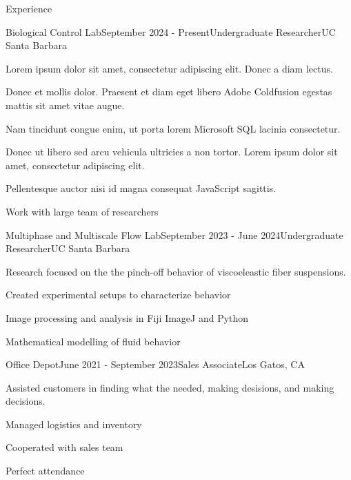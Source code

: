 \documentclass[
	11pt, %
]{resume} %
\begin{document}
\begin{rSection}{Experience}

	\begin{rSubsection}{Biological Control Lab}{September 2024 - Present}{Undergraduate Researcher}{UC Santa Barbara}
		\item Lorem ipsum dolor sit amet, consectetur adipiscing elit. Donec a diam lectus.
		\item Donec et mollis dolor. Praesent et diam eget libero Adobe Coldfusion egestas mattis sit amet vitae augue.
		\item Nam tincidunt congue enim, ut porta lorem Microsoft SQL lacinia consectetur.
		\item Donec ut libero sed arcu vehicula ultricies a non tortor. Lorem ipsum dolor sit amet, consectetur adipiscing elit.
		\item Pellentesque auctor nisi id magna consequat JavaScript sagittis.
		\item Work with large team of researchers
	\end{rSubsection}


	\begin{rSubsection}{Multiphase and Multiscale Flow Lab}{September 2023 - June 2024}{Undergraduate Researcher}{UC Santa Barbara}
		\item Research focused on the the pinch-off behavior of viscoeleastic fiber suspensions.
		\item Created experimental setups to characterize behavior
		\item Image processing and analysis in Fiji ImageJ and Python
		\item Mathematical modelling of fluid behavior
	\end{rSubsection}


	\begin{rSubsection}{Office Depot}{June 2021 - September 2023}{Sales Associate}{Los Gatos, CA}
		\item Assisted customers in finding what the needed, making desisions, and making decisions.
		\item Managed logistics and inventory
		\item Cooperated with sales team
		\item Perfect attendance
	\end{rSubsection}

\end{rSection}
\end{document}
